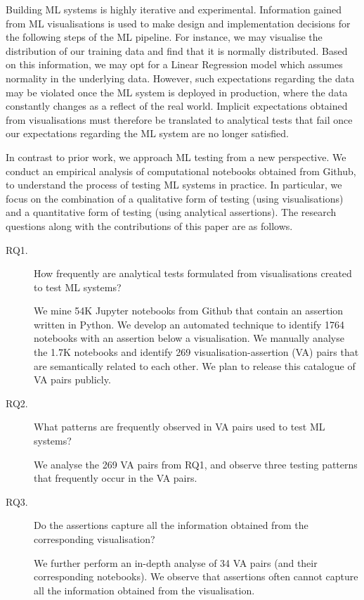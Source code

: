 \documentclass[conference]{IEEEtran}
\begin{document}
Building ML systems is highly iterative and experimental. Information gained from ML visualisations is used to make design and implementation decisions for the following steps of the ML pipeline. For instance, we may visualise the distribution of our training data and find that it is normally distributed. Based on this information, we may opt for a Linear Regression model which assumes normality in the underlying data. However, such expectations regarding the data may be violated once the ML system is deployed in production, where the data constantly changes as a reflect of the real world. Implicit expectations obtained from visualisations must therefore be translated to analytical tests that fail once our expectations regarding the ML system are no longer satisfied.

In contrast to prior work, we approach ML testing from a new perspective. We conduct an empirical analysis of computational notebooks obtained from Github, to understand the process of testing ML systems in practice. In particular, we focus on the combination of a qualitative form of testing (using visualisations) and a quantitative form of testing (using analytical assertions). The research questions along with the contributions of this paper are as follows.

\begin{description}
\item[RQ1.] How frequently are analytical tests formulated from visualisations created to test ML systems?

We mine 54K Jupyter notebooks from Github that contain an assertion written in Python. We develop an automated technique to identify 1764 notebooks with an assertion below a visualisation. We manually analyse the 1.7K notebooks and identify 269 visualisation-assertion (VA) pairs that are semantically related to each other. We plan to release this catalogue of VA pairs publicly.

\item[RQ2.] What patterns are frequently observed in VA pairs used to test ML systems?

We analyse the 269 VA pairs from RQ1, and observe three testing patterns that frequently occur in the VA pairs.

\item[RQ3.] Do the assertions capture all the information obtained from the corresponding visualisation?

We further perform an in-depth analyse of 34 VA pairs (and their corresponding notebooks). We observe that assertions often cannot capture all the information obtained from the visualisation.

\end{description}
\end{document}
